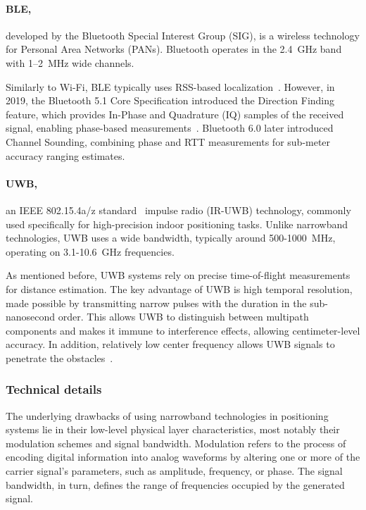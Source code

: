 \paragraph{BLE,} developed by the Bluetooth Special Interest Group (SIG), is a wireless technology for Personal Area Networks (PANs). Bluetooth operates in the \SI{2.4}{\giga\hertz} band with 1–2~\si{\mega\hertz} wide channels.

Similarly to Wi-Fi, BLE typically uses RSS-based localization~\cite{leitch2023indoor}. However, in 2019, the Bluetooth 5.1 Core Specification introduced the Direction Finding feature, which provides In-Phase and Quadrature (IQ) samples of the received signal, enabling phase-based measurements~\cite{Dyhdalovych2025BLE}. Bluetooth 6.0 later introduced Channel Sounding, combining phase and RTT measurements for sub-meter accuracy ranging estimates.

\paragraph{UWB,} an IEEE 802.15.4a/z standard~\cite{ieee802154} impulse radio (IR-UWB) technology, commonly used specifically for high-precision indoor positioning tasks. Unlike narrowband technologies, UWB uses a wide bandwidth, typically around 500-1000~\si{\mega\hertz}, operating on 3.1-10.6~\si{\giga\hertz} frequencies.

As mentioned before, UWB systems rely on precise time-of-flight measurements for distance estimation. The key advantage of UWB is high temporal resolution, made possible by transmitting narrow pulses with the duration in the sub-nanosecond order. This allows UWB to distinguish between multipath components and makes it immune to interference effects, allowing centimeter-level accuracy. In addition, relatively low center frequency allows UWB signals to penetrate the obstacles~\cite{cheraghinia2024comprehensive}.

\subsubsection{Technical details}

The underlying drawbacks of using narrowband technologies in positioning systems lie in their low-level physical layer characteristics, most notably their modulation schemes and signal bandwidth. Modulation refers to the process of encoding digital information into analog waveforms by altering one or more of the carrier signal’s parameters, such as amplitude, frequency, or phase. The signal bandwidth, in turn, defines the range of frequencies occupied by the generated signal.

